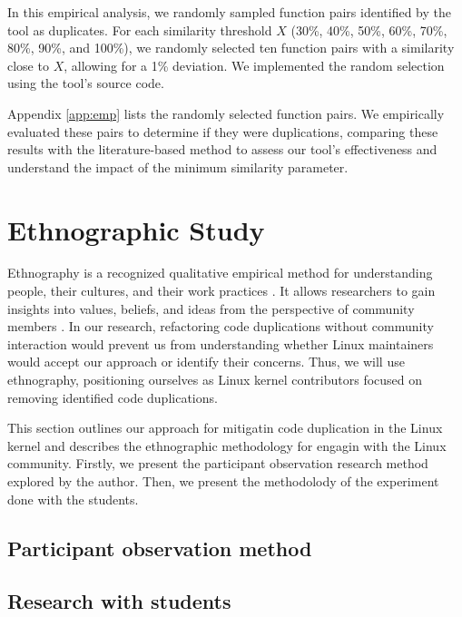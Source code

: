 In this empirical analysis, we randomly sampled function pairs identified by the tool as duplicates. For each similarity threshold \(X\) (30\%, 40\%, 50\%, 60\%, 70\%, 80\%, 90\%, and 100\%), we randomly selected ten function pairs with a similarity close to \(X\), allowing for a 1\% deviation. We implemented the random selection using the tool's source code.

Appendix \ref{app:emp} lists the randomly selected function pairs. We empirically evaluated these pairs to determine if they were duplications, comparing these results with the literature-based method to assess our tool's effectiveness and understand the impact of the minimum similarity parameter.


\section{Ethnographic Study}

\label{sec:meteth}

Ethnography is a recognized qualitative empirical method for understanding people, 
their cultures, and their work practices \citep{bookethno}. It allows researchers 
to gain insights into values, beliefs, and ideas from the perspective of community 
members \citep{ethnosoft}. In our research, refactoring code duplications without 
community interaction would prevent us from understanding whether Linux maintainers 
would accept our approach or identify their concerns. Thus, we will use ethnography, 
positioning ourselves as Linux kernel contributors focused on removing identified 
code duplications.

This section outlines our approach for mitigatin code duplication in the Linux kernel
and describes the ethnographic methodology for engagin with the Linux community. Firstly, 
we present the participant observation research method explored by the author. Then, 
we present the methodolody of the experiment done with the students.

\subsection{Participant observation method}


\subsection{Research with students}

